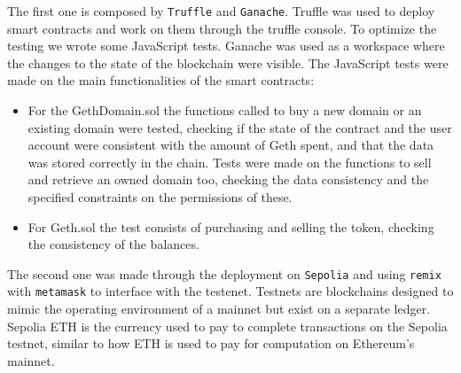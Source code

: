 \documentclass[main.tex]{subfiles}
\begin{document}
The first one is composed by \texttt{Truffle} and \texttt{Ganache}. Truffle was used to deploy smart contracts and work on them through the truffle console. To optimize the testing we wrote some JavaScript tests. Ganache was used as a workspace where the changes to the state of the blockchain were visible.
The JavaScript tests were made on the main functionalities of the smart contracts:
\begin{itemize}
    \item For the GethDomain.sol the functions called to buy a new domain or an existing domain were tested, checking if the state of the contract and the user account were consistent with the amount of Geth spent, and that the data was stored correctly in the chain. Tests were made on the functions to sell and retrieve an owned domain too, checking the data consistency and the specified constraints on the permissions of these.
    \item For Geth.sol the test consists of purchasing and selling the token, checking the consistency of the balances.
\end{itemize}

The second one was made through the deployment on \texttt{Sepolia} and using \texttt{remix} with \texttt{metamask} to interface with the testenet.
Testnets\cite{Sepolia} are blockchains designed to mimic the operating environment of a mainnet but exist on a separate ledger.  Sepolia ETH is the currency used to pay to complete transactions on the Sepolia testnet, similar to how ETH is used to pay for computation on Ethereum’s mainnet.
\end{document}
